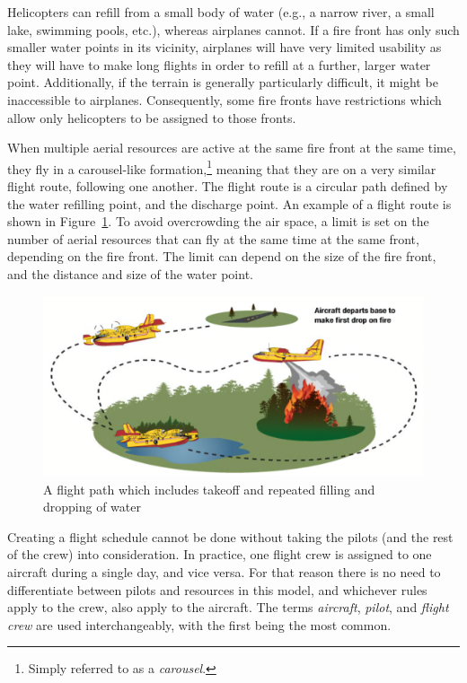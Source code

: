 Helicopters can refill from a small body of water (e.g., a narrow river, a small lake, swimming pools, etc.), whereas airplanes cannot.
If a fire front has only such smaller water points in its vicinity, airplanes will have very limited usability as they will have to make long flights in order to refill at a further, larger water point.
Additionally, if the terrain is generally particularly difficult, it might be inaccessible to airplanes.
Consequently, some fire fronts have restrictions which allow only helicopters to be assigned to those fronts.

When multiple aerial resources are active at the same fire front at the same time, they fly in a carousel-like formation,\footnote{Simply referred to as a \textit{carousel}.} meaning that they are on a very similar flight route, following one another.
The flight route is a circular path defined by the water refilling point, and the discharge point.
An example of a flight route is shown in Figure~\ref{fig:carousel}.
To avoid overcrowding the air space, a limit is set on the number of aerial resources that can fly at the same time at the same front, depending on the fire front.
The limit can depend on the size of the fire front, and the distance and size of the water point.

\begin{figure}[htb]
    \centering
    \includegraphics[width=0.95\linewidth]{img/carousel.jpg}
    \caption{A flight path which includes takeoff and repeated filling and dropping of water~\cite{Viking/Technique}}
    \label{fig:carousel}
\end{figure}

Creating a flight schedule cannot be done without taking the pilots (and the rest of the crew) into consideration.
In practice, one flight crew is assigned to one aircraft during a single day, and vice versa.
For that reason there is no need to differentiate between pilots and resources in this model, and whichever rules apply to the crew, also apply to the aircraft.
The terms \textit{aircraft}, \textit{pilot}, and \textit{flight crew} are used interchangeably, with the first being the most common.

